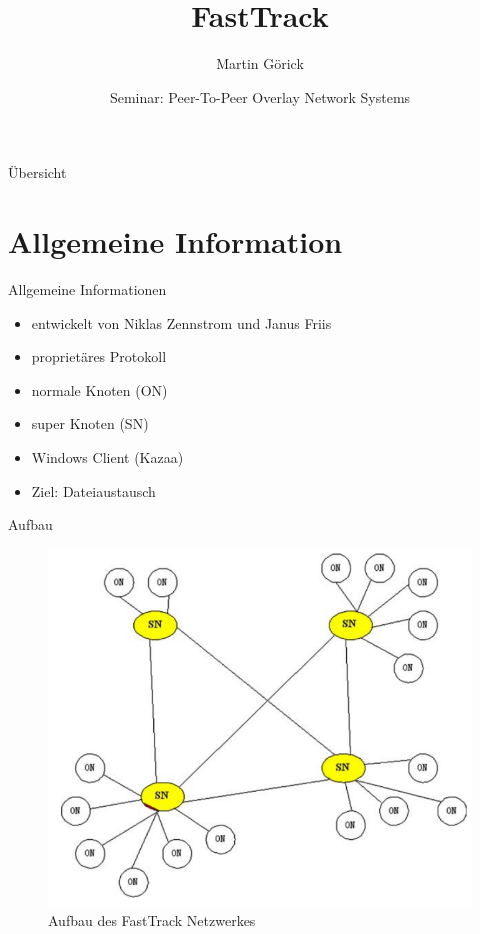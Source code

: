 \documentclass[ucs,9pt]{beamer}
\title[FastTrack] %
{FastTrack}
\subtitle
{}
\author[Author, Another] %
{Martin Görick}
\institute[FU Berlin] %
{Freie Universität Berlin}
\date[] %
{Seminar: Peer-To-Peer Overlay Network Systems}
\begin{document}
\begin{frame}[plain]
  \titlepage
\end{frame}

\begin{frame}{Übersicht}
  \tableofcontents[]%
\end{frame}



\section{Allgemeine Information}

\begin{frame}{Allgemeine Informationen}
\begin{itemize}
	\item entwickelt von Niklas Zennstrom und Janus Friis
	\item proprietäres Protokoll
	\item normale Knoten (ON)
	\item super Knoten (SN)
	\item Windows Client (Kazaa)
	\item Ziel: Dateiaustausch
\end{itemize}
\end{frame}

\begin{frame}{Aufbau}
\begin{figure}
\includegraphics[scale=0.3]{images/aufbau}
\caption{Aufbau des FastTrack Netzwerkes}
\end{figure}
\end{frame}
\end{document}

